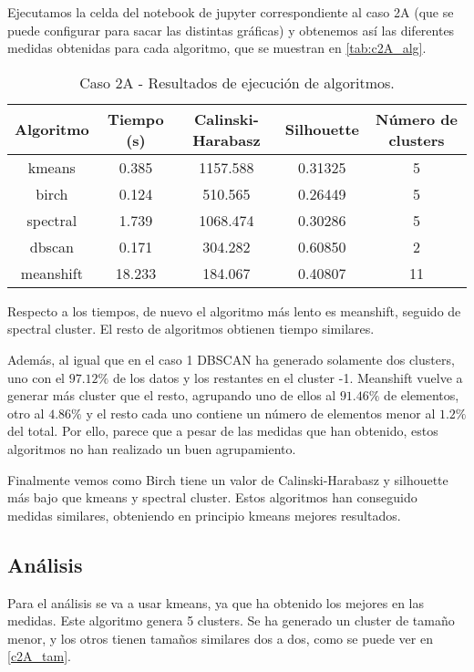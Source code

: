 Ejecutamos la celda del notebook de jupyter correspondiente al caso 2A (que se puede configurar para sacar las distintas gráficas) y obtenemos así las diferentes medidas obtenidas para cada algoritmo, que se muestran en \eqref{tab:c2A_alg}.

\begin{table}[H]
\centering
\caption{Caso 2A - Resultados de ejecución de algoritmos.}
\label{tab:c2_alg}
\begin{tabular}{ccccc}
\toprule
 Algoritmo & Tiempo (s) & Calinski-Harabasz & Silhouette & Número de clusters \\
\midrule
kmeans & 0.385 & 1157.588 & 0.31325 & 5 \\
birch & 0.124 & 510.565 & 0.26449 & 5 \\
spectral & 1.739 & 1068.474 & 0.30286 & 5 \\
dbscan & 0.171 & 304.282 & 0.60850 & 2 \\
meanshift & 18.233 & 184.067 & 0.40807 & 11 \\
\bottomrule
\end{tabular}
\end{table}

Respecto a los tiempos, de nuevo el algoritmo más lento es meanshift, seguido de spectral cluster. El resto de algoritmos obtienen tiempo similares.

Además, al igual que en el caso 1 DBSCAN ha generado solamente dos clusters, uno con el $97.12\%$ de los datos y los restantes en el cluster -1. Meanshift vuelve a generar más cluster que el resto, agrupando uno de ellos al $91.46\%$ de elementos, otro al $4.86\%$ y el resto cada uno contiene un número de elementos menor al $1.2\%$ del total. Por ello, parece que a pesar de las medidas que han obtenido, estos algoritmos no han realizado un buen agrupamiento.

Finalmente vemos como Birch tiene un valor de Calinski-Harabasz y silhouette más bajo que kmeans y spectral cluster. Estos algoritmos han conseguido medidas similares, obteniendo en principio kmeans mejores resultados.


\subsection{Análisis}


Para el análisis se va a usar kmeans, ya que ha obtenido los mejores en las medidas. Este algoritmo genera 5 clusters. Se ha generado un cluster de tamaño menor, y los otros tienen tamaños similares dos a dos, como se puede ver en \eqref{c2A_tam}.

